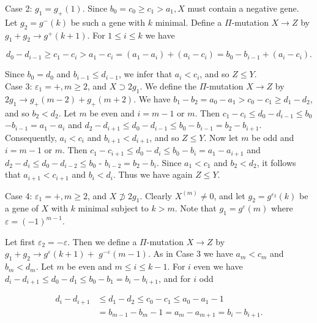 \documentclass[10pt]{article}
\begin{document}
Case 2: $g_{1}=g_{+}(1)$. Since $b_{0}=c_{0} \geqslant c_{1}>a_{1}, X$ must contain a negative gene. Let $g_{2}=g^{-}(k)$ be such a gene with $k$ minimal. Define a $\Pi$-mutation $X \rightarrow Z$ by $g_{1}+g_{2} \rightarrow g^{+}(k+1)$. For $1 \leqslant i \leqslant k$ we have

$$
d_{0}-d_{i-1} \geqslant c_{1}-c_{i}>a_{1}-c_{i}=\left(a_{1}-a_{i}\right)+\left(a_{i}-c_{i}\right)=b_{0}-b_{i-1}+\left(a_{i}-c_{i}\right) .
$$

Since $b_{0}=d_{0}$ and $b_{i-1} \leqslant d_{i-1}$, we infer that $a_{i}<c_{i}$, and so $Z \leqslant Y$.\\
Case 3: $\varepsilon_{1}=+, m \geqslant 2$, and $X \supset 2 g_{1}$. We define the $\Pi$-mutation $X \rightarrow Z$ by $2 g_{1} \rightarrow g_{+}(m-2)+g_{+}(m+2)$. We have $b_{1}-b_{2}=a_{0}-a_{1}>c_{0}-c_{1} \geqslant d_{1}-d_{2}$, and so $b_{2}<d_{2}$. Let $m$ be even and $i=m-1$ or $m$. Then $c_{1}-c_{i} \leqslant d_{0}-d_{i-1} \leqslant b_{0}$ $-b_{i-1}=a_{1}-a_{i}$ and $d_{2}-d_{i+1} \leqslant d_{0}-d_{i-1} \leqslant b_{0}-b_{i-1}=b_{2}-b_{i+1}$. Consequently, $a_{i}<c_{i}$ and $b_{i+1}<d_{i+1}$, and so $Z \leqslant Y$. Now let $m$ be odd and $i=m-1$ or $m$. Then $c_{1}-c_{i+1} \leqslant d_{0}-d_{i} \leqslant b_{0}-b_{i}=a_{1}-a_{i+1}$ and $d_{2}-d_{i} \leqslant d_{0}-d_{i-2} \leqslant b_{0}$ - $b_{i-2}=b_{2}-b_{i}$. Since $a_{1}<c_{1}$ and $b_{2}<d_{2}$, it follows that $a_{i+1}<c_{i+1}$ and $b_{i}<d_{i}$. Thus we have again $Z \leqslant Y$.

Case 4: $\varepsilon_{1}=+, m \geqslant 2$, and $X \not \supset 2 g_{1}$. Clearly $X^{(m)} \neq 0$, and let $g_{2}=g^{\varepsilon_{2}}(k)$ be a gene of $X$ with $k$ minimal subject to $k>m$. Note that $g_{1}=g^{\varepsilon}(m)$ where $\varepsilon=(-1)^{m-1}$.

Let first $\varepsilon_{2}=-\varepsilon$. Then we define a $\Pi$-mutation $X \rightarrow Z$ by $g_{1}+g_{2} \rightarrow g^{\varepsilon}(k+1)+$ $g^{-\varepsilon}(m-1)$. As in Case 3 we have $a_{m}<c_{m}$ and $b_{m}<d_{m}$. Let $m$ be even and $m \leqslant i \leqslant k-1$. For $i$ even we have $d_{i}-d_{i+1} \leqslant d_{0}-d_{1} \leqslant b_{0}-b_{1}=b_{i}-b_{i+1}$, and for $i$ odd

$$
\begin{aligned}
d_{i}-d_{i+1} & \leqslant d_{1}-d_{2} \leqslant c_{0}-c_{1} \leqslant a_{0}-a_{1}-1 \\
& =b_{m-1}-b_{m}-1=a_{m}-a_{m+1}=b_{i}-b_{i+1} .
\end{aligned}
$$
\end{document}
